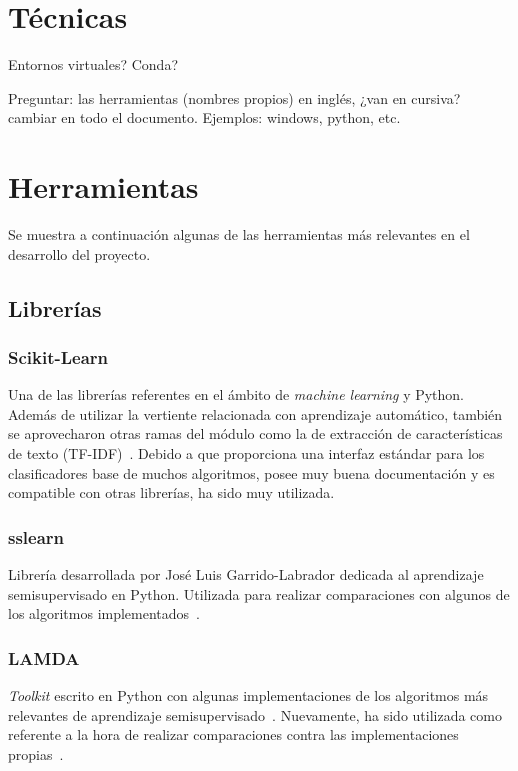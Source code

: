 
\section{Técnicas}

Entornos virtuales? Conda?

Preguntar: las herramientas (nombres propios) en inglés, ¿van en cursiva? cambiar en todo el documento. Ejemplos: windows, python, etc.

\section{Herramientas}

Se muestra a continuación algunas de las herramientas más relevantes en el desarrollo del proyecto.

\subsection{Librerías}

\subsubsection{Scikit-Learn}

Una de las librerías referentes en el ámbito de \textit{machine learning} y Python. Además de utilizar la vertiente relacionada con aprendizaje automático, también se aprovecharon otras ramas del módulo como la de extracción de características de texto (TF-IDF)~\cite{sslearnRepo}. Debido a que proporciona una interfaz estándar para los clasificadores base de muchos algoritmos, posee muy buena documentación y es compatible con otras librerías, ha sido muy utilizada.

\subsubsection{sslearn}

Librería desarrollada por José Luis Garrido-Labrador dedicada al aprendizaje semisupervisado en Python. Utilizada para realizar comparaciones con algunos de los algoritmos implementados~\cite{sslearnRepo}.

\subsubsection{LAMDA}

\textit{Toolkit} escrito en Python con algunas implementaciones de los algoritmos más relevantes de aprendizaje semisupervisado~\cite{lamdasslRepo}. Nuevamente, ha sido utilizada como referente a la hora de realizar comparaciones contra las implementaciones propias~\cite{lamdasslPaper}.

